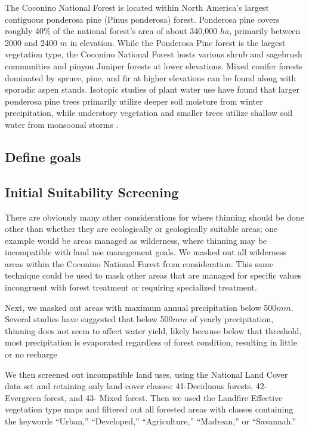 \documentclass[
  number,
  preprint,
  3p,
  onecolumn]{elsarticle}
\begin{document}
The Coconino National Forest is located within North America's largest
contiguous ponderosa pine (Pinus ponderosa) forest. Ponderosa pine
covers roughly 40\% of the national forest's area of about 340,000
\(ha\), primarily between 2000 and 2400 \(m\) in elevation. While the
Ponderosa Pine forest is the largest vegetation type, the Coconino
National Forest hosts various shrub and sagebrush communities and pinyon
Juniper forests at lower elevations. Mixed conifer forests dominated by
spruce, pine, and fir at higher elevations can be found along with
sporadic aspen stands. Isotopic studies of plant water use have found
that larger ponderosa pine trees primarily utilize deeper soil moisture
from winter precipitation, while understory vegetation and smaller trees
utilize shallow soil water from monsoonal storms
\citep{kerhoulas2013, kerhoulas2023}.

\subsection{Define goals}\label{define-goals}

\subsection{Initial Suitability
Screening}\label{initial-suitability-screening}

There are obviously many other considerations for where thinning should
be done other than whether they are ecologically or geologically
suitable areas; one example would be areas managed as wilderness, where
thinning may be incompatible with land use management goals. We masked
out all wilderness areas within the Coconino National Forest from
consideration. This same technique could be used to mask other areas
that are managed for specific values incongruent with forest treatment
or requiring specialized treatment.

Next, we masked out areas with maximum annual precipitation below
500\(mm\). Several studies have suggested that below 500\(mm\) of yearly
precipitation, thinning does not seem to affect water yield, likely
because below that threshold, most precipitation is evaporated
regardless of forest condition, resulting in little or no recharge
\citep{bosch1982, hibbert1979b, adams2012a, biederman2022a}

We then screened out incompatible land uses, using the National Land
Cover data set and retaining only land cover classes: 41-Deciduous
forests, 42- Evergreen forest, and 43- Mixed forest. Then we used the
Landfire Effective vegetation type maps and filtered out all forested
areas with classes containing the keywords ``Urban,'' ``Developed,''
``Agriculture,'' ``Madrean,'' or ``Savannah.''
\end{document}
